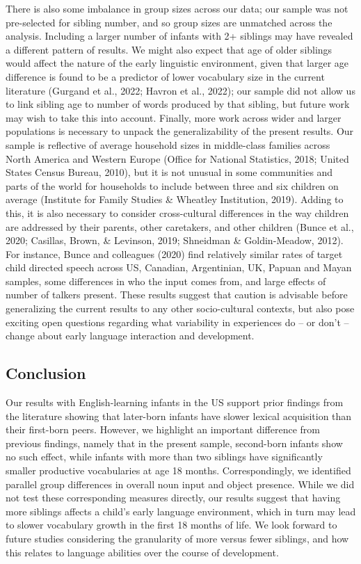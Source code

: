 \documentclass[
  man,mask,floatsintext]{apa6}
\begin{document}
There is also some imbalance in group sizes across our data; our sample was not pre-selected for sibling number, and so group sizes are unmatched across the analysis. Including a larger number of infants with 2+ siblings may have revealed a different pattern of results. We might also expect that age of older siblings would affect the nature of the early linguistic environment, given that larger age difference is found to be a predictor of lower vocabulary size in the current literature (Gurgand et al., 2022; Havron et al., 2022); our sample did not allow us to link sibling age to number of words produced by that sibling, but future work may wish to take this into account. Finally, more work across wider and larger populations is necessary to unpack the generalizability of the present results. Our sample is reflective of average household sizes in middle-class families across North America and Western Europe (Office for National Statistics, 2018; United States Census Bureau, 2010), but it is not unusual in some communities and parts of the world for households to include between three and six children on average (Institute for Family Studies \& Wheatley Institution, 2019). Adding to this, it is also necessary to consider cross-cultural differences in the way children are addressed by their parents, other caretakers, and other children (Bunce et al., 2020; Casillas, Brown, \& Levinson, 2019; Shneidman \& Goldin‐Meadow, 2012). For instance, Bunce and colleagues (2020) find relatively similar rates of target child directed speech across US, Canadian, Argentinian, UK, Papuan and Mayan samples, some differences in who the input comes from, and large effects of number of talkers present. These results suggest that caution is advisable before generalizing the current results to any other socio-cultural contexts, but also pose exciting open questions regarding what variability in experiences do -- or don't -- change about early language interaction and development.

\hypertarget{conclusion}{%
\subsection{Conclusion}\label{conclusion}}

Our results with English-learning infants in the US support prior findings from the literature showing that later-born infants have slower lexical acquisition than their first-born peers. However, we highlight an important difference from previous findings, namely that in the present sample, second-born infants show no such effect, while infants with more than two siblings have significantly smaller productive vocabularies at age 18 months. Correspondingly, we identified parallel group differences in overall noun input and object presence. While we did not test these corresponding measures directly, our results suggest that having more siblings affects a child's early language environment, which in turn may lead to slower vocabulary growth in the first 18 months of life. We look forward to future studies considering the granularity of more versus fewer siblings, and how this relates to language abilities over the course of development.
\end{document}
